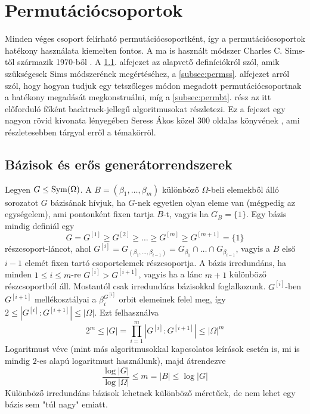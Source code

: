 \section{Permutációcsoportok}
\label{sec:permutacio}
Minden véges csoport felírható permutációcsoportként, így a permutációcsoportok hatékony használata kiemelten fontos.
A ma is használt módszer Charles C. Sims-től származik 1970-ből \cite{Sim70}.
A \ref{subsec:permdef}. alfejezet az alapvető definíciókról szól, amik szükségesek Sims módszerének megértéséhez,
a \ref{subsec:permss}. alfejezet arról szól, hogy hogyan tudjuk egy tetszőleges módon megadott permutációcsoportnak a hatékony megadását megkonstruálni,
míg a \ref{subsec:permbt}. rész az itt előforduló főként backtrack-jellegű algoritmusokat részletezi.
Ez a fejezet egy nagyon rövid kivonata lényegében Seress Ákos közel 300 oldalas könyvének \cite{Ser03}, ami részletesebben tárgyal erről a témakörröl.

\subsection{Bázisok és erős generátorrendszerek}
\label{subsec:permdef}
Legyen $G \le \operatorname{Sym}(\Omega)$.
A $B=(\beta_1,\dots,\beta_m)$ különböző $\Omega$-beli elemekből álló sorozatot $G$ bázisának hívjuk,
ha $G$-nek egyetlen olyan eleme van (mégpedig az egységelem), ami pontonként fixen tartja $B$-t, vagyis ha $G_B=\{1\}$.
Egy bázis mindig definiál egy
\begin{equation}
\label{eq:permlanc}
G = G^{[1]} \ge G^{[2]} \ge \dots \ge G^{[m]} \ge G^{[m+1]} = \{1\}
\end{equation}
részcsoport-láncot, ahol $G^{[i]}=G_{(\beta_1,\dots,\beta_{i-1})}=G_{\beta_1}\cap\dots\cap G_{\beta_{i-1}}$, vagyis a $B$ első $i-1$ elemét fixen tartó csoportelemek részcsoportja.
A bázis irredundáns, ha minden $1\le i \le m$-re $G^{[i]} > G^{[i+1]}$, vagyis ha a lánc $m+1$ különböző részcsoportból áll.
Mostantól csak irredundáns bázisokkal foglalkozunk.
$G^{[i]}$-ben $G^{[i+1]}$ mellékosztályai a $\beta_i^{G^{[i]}}$ orbit elemeinek felel meg, így $2 \le \left| G^{[i]} : G^{[i+1]} \right| \le |\Omega|$.
Ezt felhasználva
\begin{equation}
\label{eq:permmeret}
2^m \le |G|=\prod_{i=1}^m \left| G^{[i]} : G^{[i+1]} \right| \le |\Omega|^m
\end{equation}
Logaritmust véve (mint más algoritmusokkal kapcsolatos leírások esetén is, mi is mindig $2$-es alapú logaritmust használunk), majd átrendezve
\begin{equation}
\label{eq:permmeret2}
\frac{\log |G|}{\log |\Omega|} \le m = |B| \le \log |G|
\end{equation}
Különböző irredundáns bázisok lehetnek különböző méretűek, de nem lehet egy bázis sem "túl nagy" emiatt.

